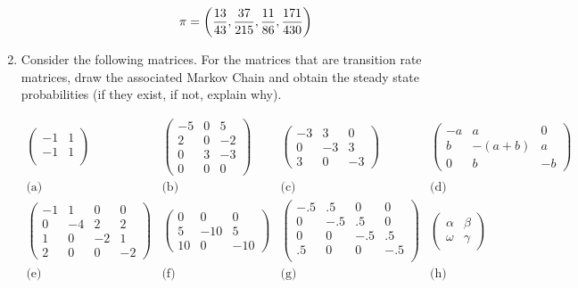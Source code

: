\documentclass[12pt]{article}
\begin{document}
\begin{enumerate}
\begin{enumerate}
$$\pi=\left({13\over 43},{37\over 215},{11\over 86},{171\over 430}\right)$$

\end{enumerate}

\item Consider the following matrices. For the matrices that are transition rate matrices, draw the associated Markov Chain and obtain the steady state probabilities (if they exist, if not, explain why).

$$\begin{array}{cccc}
\begin{pmatrix}
-1&1\\
-1&1\\
\end{pmatrix}
&
\begin{pmatrix}
-5&0&5\\
2&0&-2\\
0&3&-3\\
0&0&0
\end{pmatrix}&
\begin{pmatrix}
-3&3&0\\
0&-3&3\\
3&0&-3
\end{pmatrix}
&
\begin{pmatrix}
-a&a&0\\
b&-(a+b)&a\\
0&b&-b
\end{pmatrix}\\
\text{(a)}&\text{(b)}& \text{(c)}&\text{(d)}\\
\begin{pmatrix}
-1&1&0&0\\
0&-4&2&2\\
1&0&-2&1\\
2&0&0&-2
\end{pmatrix}&
\begin{pmatrix}
0&0&0\\
5&-10&5\\
10&0&-10
\end{pmatrix}
&
\begin{pmatrix}
-.5&.5&0&0\\
0&-.5&.5&0\\
0&0&-.5&.5\\
.5&0&0&-.5\\
\end{pmatrix}
&
\begin{pmatrix}
\alpha&\beta\\
\omega&\gamma
\end{pmatrix}
\\
\text{(e)}&\text{(f)}& \text{(g)}&\text{(h)}\\
\end{array}$$


\end{enumerate}
\end{document}
